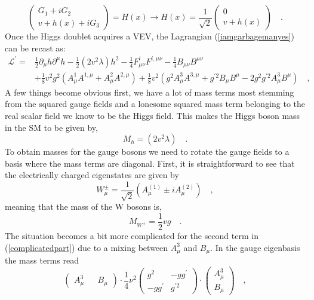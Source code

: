 \begin{equation}
 \begin{pmatrix}
G_1 + i G_2 \\ 
v + h(x) + i G_3 
\end{pmatrix} = H (x) \rightarrow H (x) =  \frac{1}{\sqrt{2}} \begin{pmatrix}
0 \\ 
v + h(x) 
\end{pmatrix} \quad .
\label{shame}
\end{equation}
Once the Higgs doublet acquires a VEV, the Lagrangian (\ref{iamgarbagemanyes}) can be recast as:
\begin{align}
\mathcal{L}^\prime = & \frac{1}{2} \partial_\mu h \partial^\mu h - \frac{1}{2} (2v^2 \lambda) h^2
 - \frac{1}{4} F^i_{\mu \nu} F^{i , \mu \nu} - \frac{1}{4} B_{\mu \nu} B^{\mu \nu}  \nonumber \\
& + \frac{1}{8} v^2 g^2 (A^1_\mu A^{1,\mu}+ A^2_\mu A^{2,\mu}) +  \frac{1}{8} v^2  (g^2  A^3_\mu A^{3,\mu} + g^{\prime 2} B_\mu B^\mu - 2 g^2 g^{\prime 2} A^3_\mu B^\mu ) \quad , 
\label{complicatedpart}
\end{align}
A few things become obvious first, we have a lot of mass terms most stemming from the squared gauge fields and a lonesome squared mass term belonging to the real scalar field we know to be the Higgs field. This makes the Higgs boson mass in the SM to be given by,
%
\begin{equation}
M_h= (2v^2 \lambda) \quad .  
\end{equation}
%
To obtain masses for the gauge bosons we need to rotate the gauge fields to a basis where the mass terms are diagonal. First, it is straightforward to see that the electrically charged eigenstates are given by %
\begin{equation}
W^\pm_\mu = \frac{1}{\sqrt{2}} (A^{(1)}_\mu \pm i A^{(2)}_\mu) \quad , 
\label{gagestate}
\end{equation}
meaning that the mass of the W bosons is, 
\begin{equation}
M_{W^\pm}= \frac{1}{2} v g \quad .
\end{equation}
The situation becomes a bit more complicated for the second term in (\ref{complicatedpart}) due to a mixing between $A_\mu^3$ and $B_\mu$. In the gauge eigenbasis the mass terms read
\begin{equation}
\begin{pmatrix}
A_\mu^3 && B_\mu
\end{pmatrix} \cdot  \frac{1}{4} \nu ^2 \begin{pmatrix}
g^2  & -g g^\prime \\
-g g^\prime & g^{\prime 2} 
\end{pmatrix} \cdot \begin{pmatrix}
A_\mu^3 \\  B_\mu
\end{pmatrix}  \quad , 
\end{equation} 
